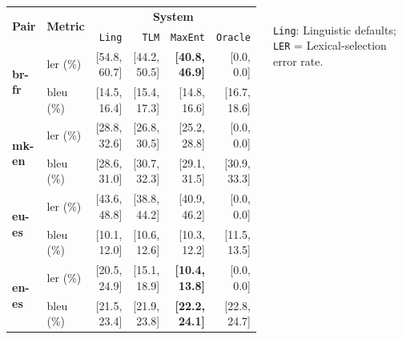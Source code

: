 \documentclass[25pt, a0paper, portrait, margin=0mm, innermargin=15mm,blockverticalspace=15mm, colspace=15mm, subcolspace=8mm]{tikzposter}
\begin{document}
\begin{columns}
{\begin{center}
  \begin{tabular}{|l|l|r|r|r||r|}
    \hline
    \multirow{2}{*}{{\bf Pair}}  & \multirow{2}{*}{{\bf Metric}} & \multicolumn{4}{|c|}{{\bf System}} \\ \cline{3-6}
                                 &              & {\tt Ling} & {\tt TLM} & \texttt{MaxEnt} & \texttt{Oracle} \\
    \hline %
    \multirow{2}{*}{{\bf br-fr}} & {\sc ler} (\%)     & [54.8, 60.7] & [44.2, 50.5]  & {\bf [40.8, 46.9]} & [0.0, 0.0]      \\ 
                                 & {\sc bleu} (\%)    & [14.5, 16.4] & [15.4, 17.3]  & [14.8, 16.6] & [16.7, 18.6]     \\ 
    \hline %
    \multirow{2}{*}{{\bf mk-en}} & {\sc ler} (\%)     & [28.8, 32.6] & [26.8, 30.5]  & [25.2, 28.8] & [0.0, 0.0]    \\ 
                                 & {\sc bleu} (\%)    & [28.6, 31.0] & [30.7, 32.3]  & [29.1, 31.5] & [30.9, 33.3]    \\ 
    \hline %
    \multirow{2}{*}{{\bf eu-es}} & {\sc ler} (\%)      & [43.6, 48.8] & [38.8, 44.2]  & [40.9, 46.2] & [0.0, 0.0]     \\ 
                                 & {\sc bleu} (\%)     & [10.1, 12.0] & [10.6, 12.6]  & [10.3, 12.2] & [11.5, 13.5]     \\ 
    \hline %
    \multirow{2}{*}{{\bf en-es}} & {\sc ler} (\%)      & [20.5, 24.9] & [15.1, 18.9]  & {\bf [10.4, 13.8]} & [0.0, 0.0]     \\ 
                                 & {\sc bleu} (\%)     & [21.5, 23.4] & [21.9, 23.8]  & {\bf [22.2, 24.1]} & [22.8, 24.7]     \\ 
    \hline
  \end{tabular}

 \end{center}
~\\
 \texttt{Ling}: Linguistic defaults; \texttt{LER} = Lexical-selection error rate.

}


\end{columns}
\end{document}
